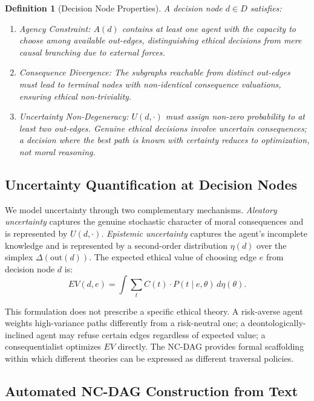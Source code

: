 \documentclass[11pt,letterpaper]{article}
\theoremstyle{defn}
\newtheorem{definition}{Definition}
\begin{document}
\begin{definition}[Decision Node Properties]
A decision node $d \in D$ satisfies:
\begin{enumerate}[label=(\roman*),leftmargin=2em]
\item \textit{Agency Constraint:} $A(d)$ contains at least one agent with the capacity to choose among available out-edges, distinguishing ethical decisions from mere causal branching due to external forces.
\item \textit{Consequence Divergence:} The subgraphs reachable from distinct out-edges must lead to terminal nodes with non-identical consequence valuations, ensuring ethical non-triviality.
\item \textit{Uncertainty Non-Degeneracy:} $U(d, \cdot)$ must assign non-zero probability to at least two out-edges. Genuine ethical decisions involve uncertain consequences; a decision where the best path is known with certainty reduces to optimization, not moral reasoning.
\end{enumerate}
\end{definition}

\subsection{Uncertainty Quantification at Decision Nodes}

We model uncertainty through two complementary mechanisms. \textit{Aleatory uncertainty} captures the genuine stochastic character of moral consequences and is represented by $U(d, \cdot)$. \textit{Epistemic uncertainty} captures the agent's incomplete knowledge and is represented by a second-order distribution $\eta(d)$ over the simplex $\Delta(\text{out}(d))$. The expected ethical value of choosing edge $e$ from decision node $d$ is:
\[ EV(d, e) = \int \sum_{t} C(t) \cdot P(t \mid e, \theta) \, d\eta(\theta). \]

This formulation does not prescribe a specific ethical theory. A risk-averse agent weights high-variance paths differently from a risk-neutral one; a deontologically-inclined agent may refuse certain edges regardless of expected value; a consequentialist optimizes $EV$ directly. The NC-DAG provides formal scaffolding within which different theories can be expressed as different traversal policies.

\subsection{Automated NC-DAG Construction from Text}
\label{sec:pipeline}
\end{document}
